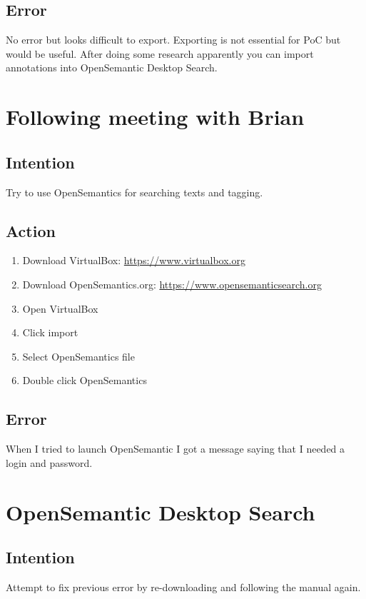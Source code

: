 \documentclass{article}
\begin{document}
\subsection{Error}
No error but looks difficult to export. Exporting is not essential for PoC but would be useful. After doing some research apparently you can import annotations into OpenSemantic Desktop Search. 

\section{Following meeting with Brian}
\subsection{Intention}
Try to use OpenSemantics for searching texts and tagging. 
\subsection{Action}
\begin{enumerate}
    \item Download VirtualBox: \href{https://www.virtualbox.org}{https://www.virtualbox.org}
    \item Download OpenSemantics.org: \href{https://www.opensemanticsearch.org}{https://www.opensemanticsearch.org}
    \item Open VirtualBox 
    \item Click import 
    \item Select OpenSemantics file 
    \item Double click OpenSemantics 
\end{enumerate}
\subsection{Error}
When I tried to launch OpenSemantic I got a message saying that I needed a login and password. 

\section{OpenSemantic Desktop Search }
\subsection{Intention}
Attempt to fix previous error by re-downloading and following the manual again.
\end{document}
